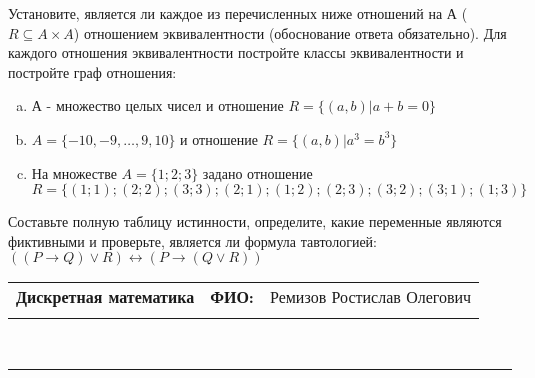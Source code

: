 \documentclass[10pt]{exam}
\newcommand{\class}{Дискретная математика}
\newcommand{\examdate}{}
\begin{document}
\begin{questions}
\question
Установите, является ли каждое из перечисленных ниже отношений на А ($R \subseteq A \times A$) отношением эквивалентности (обоснование ответа обязательно). Для каждого отношения эквивалентности 
постройте классы эквивалентности и постройте граф отношения:
\begin{enumerate}[a)]\setcounter{enumi}{0}
\item А - множество целых чисел и отношение $R = \{(a,b)|a + b = 0\}$
\item $A = \{-10, -9, …, 9, 10\}$ и отношение $R = \{(a,b)|a^{3} = b^{3}\}$
\item На множестве $A = \{1; 2; 3\}$ задано отношение $R = \{(1; 1); (2; 2); (3; 3); (2; 1); (1; 2); (2; 3); (3; 2); (3; 1); (1; 3)\}$

\end{enumerate}\question Составьте полную таблицу истинности, определите, какие переменные являются фиктивными и проверьте, является ли формула тавтологией:
$((P \rightarrow Q) \lor R) \leftrightarrow (P \rightarrow (Q \lor R))$

\end{questions}
\newpage
\begin{flushright}
\begin{tabular}{p{2.8in} r l}
\textbf{\class} & \textbf{ФИО:} &Ремизов Ростислав Олегович
\\

\textbf{\examdate} &&\\
\end{tabular}\\
\end{flushright}
\rule[1ex]{\textwidth}{.1pt}
\end{document}

